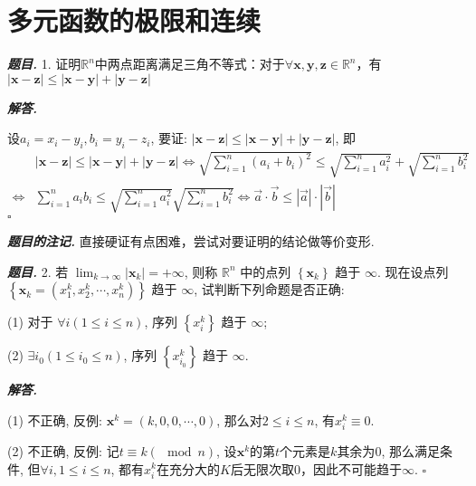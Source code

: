 \documentclass[10pt, a4paper, oneside]{ctexart}
\newenvironment{problem}{\begin{framed}\par\noindent\textbf{\textit{题目. }}}{\end{framed}\par}
\newenvironment{solution}{%
  \par\noindent\textbf{\textit{解答. }}\ignorespaces
}{%
  \hfill\ensuremath{\square}\par %
}
\newenvironment{note}{\par\noindent\textbf{\textit{题目的注记. }}\ignorespaces}{\par}
\begin{document}
\section{多元函数的极限和连续}

\begin{problem}
1. 证明$\mathbb{R}^n$中两点距离满足三角不等式：对于$\forall \bm{x},\bm{y},\bm{z}\in \mathbb{R}^n$，有$|\bm{x}-\bm{z}|\leq |\bm{x}-\bm{y}|+|\bm{y}-\bm{z}|$
\end{problem}

\begin{solution}
设$a_i=x_i-y_i, b_i=y_i-z_i$, 要证: $|\bm{x}-\bm{z}|\leq |\bm{x}-\bm{y}|+|\bm{y}-\bm{z}|$, 即
\begin{align*}
    &|\bm{x}-\bm{z}|\leq |\bm{x}-\bm{y}|+|\bm{y}-\bm{z}| \iff \sqrt{\sum_{i=1}^n (a_i+b_i)^2}\leq \sqrt{\sum_{i=1}^n a_i^2}+\sqrt{\sum_{i=1}^n b_i^2}\\\iff& \sum_{i=1}^n a_ib_i\leq \sqrt{\sum_{i=1}^n a_i^2}\sqrt{\sum_{i=1}^n b_i^2}\iff \vec{a}\cdot \vec{b}\leq |\vec{a}|\cdot|\vec{b}|
\end{align*}
\end{solution}
\begin{note}
    直接硬证有点困难，尝试对要证明的结论做等价变形.
\end{note}

\begin{problem}
2. 若 $\lim _{k \rightarrow \infty}\left|\boldsymbol{x}_k\right|=+\infty$, 则称 $\mathbb{R}^n$ 中的点列 $\left\{\boldsymbol{x}_k\right\}$ 趋于 $\infty$. 现在设点列 $\left\{\boldsymbol{x}_k=\left(x_1^k, x_2^k, \cdots, x_n^k\right)\right\}$ 趋于 $\infty$, 试判断下列命题是否正确:

(1) 对于 $\forall i(1 \leqslant i \leqslant n)$, 序列 $\left\{x_i^k\right\}$ 趋于 $\infty$;

(2) $\exists i_0\left(1 \leqslant i_0 \leqslant n\right)$, 序列 $\left\{x_{i_0}^k\right\}$ 趋于 $\infty$.
\end{problem}
\begin{solution}
    (1) 不正确, 反例: $\bm{x}^k=(k,0,0,\cdots,0)$, 那么对$2\leq i\leq n$, 有$x_i^k\equiv 0$.
    
    (2) 不正确, 反例: 记$t\equiv k (\mod n)$, 设$\bm{x}^k$的第$t$个元素是$k$其余为$0$, 那么满足条件, 但$\forall i, 1\leq i \leq n$, 都有$x_{i}^k$在充分大的$K$后无限次取$0$，因此不可能趋于$\infty$.
\end{solution}
\end{document}
